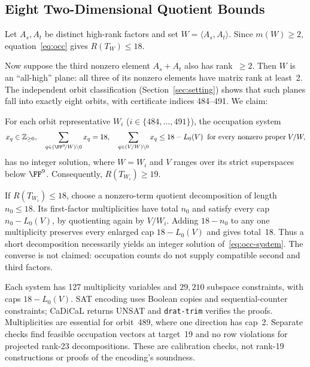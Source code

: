 \documentclass[11pt,a4paper]{article}
\begin{document}
\subsection{Eight Two-Dimensional Quotient Bounds}\label{sec:dim2}

Let $A_s,A_t$ be distinct high-rank factors and set $W=\langle A_s,A_t\rangle$. Since $m(W)\ge2$, equation~\eqref{eq:occ} gives $R(T_W)\le18$.

Now suppose the third nonzero element $A_s+A_t$ also has rank~$\ge 2$.  Then $W$ is an ``all-high'' plane: all three of its nonzero elements have matrix rank at least~2.  The independent orbit classification (Section~\ref{sec:setting}) shows that such planes fall into exactly eight orbits, with certificate indices 484--491.  We claim:

\begin{proposition}\label{prop:dim2}
  For each orbit representative $W_i$ ($i\in\{484,\ldots,491\}$), the occupation system
  \begin{equation}\label{eq:occ-system}
    x_q\in\mathbb{Z}_{\ge 0},\quad \sum_{q\in(\FF^9\!/W)\setminus 0}x_q = 18,\quad
    \sum_{q\in (V/W)\setminus 0}x_q \le 18-L_0(V) \;\;\text{for every nonzero proper}\;V/W,
  \end{equation}
  has no integer solution, where $W=W_i$ and $V$ ranges over its strict superspaces below $\FF^9$. Consequently, $R(T_{W_i})\ge19$.
\end{proposition}

If $R(T_{W_i})\le18$, choose a nonzero-term quotient decomposition of length $n_0\le18$. Its first-factor multiplicities have total $n_0$ and satisfy every cap $n_0-L_0(V)$, by quotienting again by $V/W_i$. Adding $18-n_0$ to any one multiplicity preserves every enlarged cap $18-L_0(V)$ and gives total~18. Thus a short decomposition necessarily yields an integer solution of~\eqref{eq:occ-system}. The converse is not claimed: occupation counts do not supply compatible second and third factors.

Each system has 127 multiplicity variables and $29{,}210$ subspace constraints, with caps $18-L_0(V)$. SAT encoding uses Boolean copies and sequential-counter constraints; CaDiCaL returns UNSAT and \texttt{drat-trim} verifies the proofs. Multiplicities are essential for orbit~489, where one direction has cap~2. Separate checks find feasible occupation vectors at target~19 and no row violations for projected rank-23 decompositions. These are calibration checks, not rank-19 constructions or proofs of the encoding's soundness.
\end{document}
